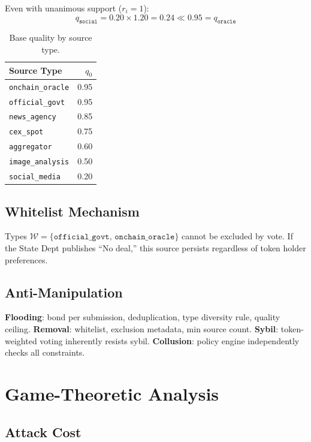 \documentclass[11pt,a4paper,twocolumn]{article}
\begin{document}
Even with unanimous support ($r_i=1$):
\begin{equation}
    q_{\texttt{social}} = 0.20 \times 1.20 = 0.24 \ll 0.95 = q_{\texttt{oracle}}
    \label{eq:cap}
\end{equation}

\begin{table}[h]
\centering
\caption{Base quality by source type.}
\label{tab:quality}
\footnotesize
\begin{tabular}{@{}lr@{}}
\toprule
\textbf{Source Type} & $q_0$ \\
\midrule
\texttt{onchain\_oracle} & 0.95 \\
\texttt{official\_govt} & 0.95 \\
\texttt{news\_agency} & 0.85 \\
\texttt{cex\_spot} & 0.75 \\
\texttt{aggregator} & 0.60 \\
\texttt{image\_analysis} & 0.50 \\
\texttt{social\_media} & 0.20 \\
\bottomrule
\end{tabular}
\end{table}

\subsection{Whitelist Mechanism}

Types $\mathcal{W} = \{\texttt{official\_govt},\, \texttt{onchain\_oracle}\}$ cannot be excluded by vote. If the State Dept publishes ``No deal,'' this source persists regardless of token holder preferences.

\subsection{Anti-Manipulation}

\textbf{Flooding}: bond per submission, deduplication, type diversity rule, quality ceiling. \textbf{Removal}: whitelist, exclusion metadata, min source count. \textbf{Sybil}: token-weighted voting inherently resists sybil. \textbf{Collusion}: policy engine independently checks all constraints.

\section{Game-Theoretic Analysis}

\subsection{Attack Cost}
\end{document}
